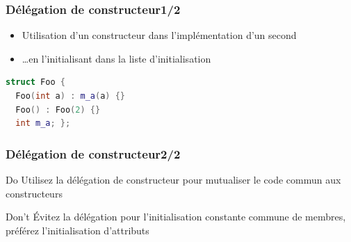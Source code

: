 \documentclass[C++.tex]{subfiles}
\begin{document}
\begin{frame}[fragile]
	\frametitle{Délégation de constructeur\titlehfill{}1/2}
	\begin{itemize}
		\item Utilisation d'un constructeur dans l'implémentation d'un second
		\item \ldots{}en \og l'initialisant\fg{} dans la liste d'initialisation
	\end{itemize}

	\begin{lstlisting}[language=C++]
struct Foo {
  Foo(int a) : m_a(a) {}
  Foo() : Foo(2) {}
  int m_a; };\end{lstlisting}
\end{frame}

\begin{frame}[fragile]
	\frametitle{Délégation de constructeur\titlehfill{}2/2}
	\begin{exampleblock}{Do}
		Utilisez la délégation de constructeur pour mutualiser le code commun aux constructeurs

	\end{exampleblock}

	\begin{alertblock}{Don't}
		Évitez la délégation pour l'initialisation constante commune de membres, préférez l'initialisation d'attributs
	\end{alertblock}
\end{frame}
\end{document}
